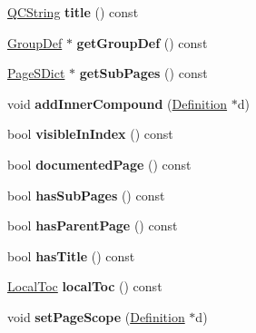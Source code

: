 \begin{DoxyCompactItemize}
\mbox{\hyperlink{class_q_c_string}{Q\+C\+String}} {\bfseries title} () const
\item 
\mbox{\label{class_page_def_a28a46a21704f59de4ae7fdf410299cf7}} 
\mbox{\hyperlink{class_group_def}{Group\+Def}} $\ast$ {\bfseries get\+Group\+Def} () const
\item 
\mbox{\label{class_page_def_a45ff8031c22a1fae961a80e1ef5092aa}} 
\mbox{\hyperlink{class_page_s_dict}{Page\+S\+Dict}} $\ast$ {\bfseries get\+Sub\+Pages} () const
\item 
\mbox{\label{class_page_def_abe80a9454b6ec60ca084ae1eeb7e29ef}} 
void {\bfseries add\+Inner\+Compound} (\mbox{\hyperlink{class_definition}{Definition}} $\ast$d)
\item 
\mbox{\label{class_page_def_a1a93ca13f2e7e6aebacda5b821f5f141}} 
bool {\bfseries visible\+In\+Index} () const
\item 
\mbox{\label{class_page_def_a728c6bd8d61e42a8bf1741178b5a5dad}} 
bool {\bfseries documented\+Page} () const
\item 
\mbox{\label{class_page_def_a6f3efe32c12cc22bfc816208268bdb52}} 
bool {\bfseries has\+Sub\+Pages} () const
\item 
\mbox{\label{class_page_def_a338fe7c80f290e3f8b180fe0070d3885}} 
bool {\bfseries has\+Parent\+Page} () const
\item 
\mbox{\label{class_page_def_af1e7d95d0ea082e8e7d0cb4bf94cc48c}} 
bool {\bfseries has\+Title} () const
\item 
\mbox{\label{class_page_def_a07e18a4a6d53c04905d5d8a6822e46a2}} 
\mbox{\hyperlink{class_local_toc}{Local\+Toc}} {\bfseries local\+Toc} () const
\item 
\mbox{\label{class_page_def_a8419470bbca997aed992512ddbfefcae}} 
void {\bfseries set\+Page\+Scope} (\mbox{\hyperlink{class_definition}{Definition}} $\ast$d)
\item 
\mbox{\label{class_page_def_a5c73e687a25ad374e014d6e99da222f9}} 

\end{DoxyCompactItemize}
